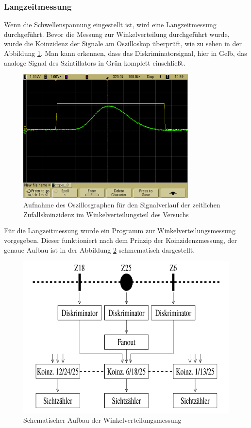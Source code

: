 \documentclass{article}
\begin{document}
\subsubsection*{Langzeitmessung}
Wenn die Schwellenspannung eingestellt ist, wird eine Langzeitmessung durchgeführt.
Bevor die Messung zur Winkelverteilung durchgeführt wurde, wurde die Koinzidenz der Signale
am Oszilloskop überprüft, wie zu sehen in der Abbildung \ref{fig:SignalWinkelverteilung}.
Man kann erkennen, dass das Diskriminatorsignal, hier in Gelb, das analoge Signal des Szintillators in Grün komplett einschließt.
\begin{figure}[H]
    \centering
    \includegraphics[width=0.8\textwidth]{figures/Zufallskoinzidenz.png}
    \caption{Aufnahme des Oszillosgraphen für den Signalverlauf der zeitlichen Zufallskoinzidenz im Winkelverteilungsteil des Versuchs}
    \label{fig:SignalWinkelverteilung}
\end{figure}
Für die Langzeitmessung wurde ein Programm zur Winkelverteilungsmessung vorgegeben. Dieser funktioniert nach dem Prinzip der Koinzidenzmessung, der genaue Aufbau ist in der Abbildung \ref{fig:AufbauWinkelverteilungLangzeit} schmematisch dargestellt.
\begin{figure}[H]
    \centering
    \includegraphics[width=1\textwidth]{figures/SchematischWinkelverteilung.png}
    \caption{Schematischer Aufbau der Winkelverteilungsmessung}
    \label{fig:AufbauWinkelverteilungLangzeit}
\end{figure}
\end{document}
